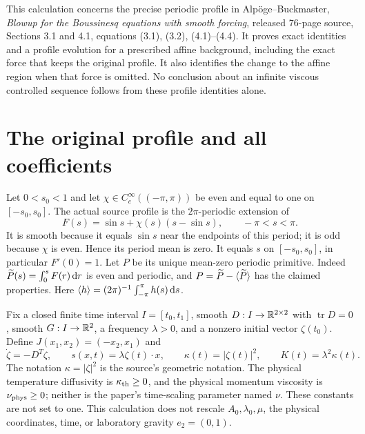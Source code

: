 This calculation concerns the precise periodic profile in Alp\"oge--Buckmaster,
\emph{Blowup for the Boussinesq equations with smooth forcing}, released
76-page source, Sections 3.1 and 4.1, equations (3.1), (3.2), (4.1)--(4.4).
It proves exact identities and a profile evolution for a prescribed affine
background, including the exact force that keeps the original profile.
It also identifies the change to the affine region when that force is
omitted. No conclusion about an infinite viscous controlled sequence follows
from these profile identities alone.

\section{The original profile and all coefficients}

Let $0<s_0<1$ and let $\chi\in C_c^\infty((-\pi,\pi))$ be even and equal to
one on $[-s_0,s_0]$. The actual source profile is the $2\pi$-periodic extension
of
\begin{equation}\label{pd:eq:F}
 F(s)=\sin s+\chi(s)(s-\sin s),\qquad -\pi<s<\pi.
\end{equation}
It is smooth because it equals $\sin s$ near the endpoints of this period;
it is odd because $\chi$ is even. Hence its period mean is zero. It equals
$s$ on $[-s_0,s_0]$, in particular $F'(0)=1$. Let $P$ be its unique
mean-zero periodic primitive. Indeed
$\widetilde P(s)=\int_0^s F(r)\,\mathrm d r$ is even and periodic, and
$P=\widetilde P-\langle \widetilde P\rangle$ has the claimed properties. Here
$\langle h\rangle=(2\pi)^{-1}\int_{-\pi}^{\pi}h(s)\,\mathrm d s$.

Fix a closed finite time interval $I=[t_0,t_1]$, smooth
$D:I\to\mathbb R^{2\times2}$ with $\operatorname{tr}D=0$, smooth
$G:I\to\mathbb R^2$, a frequency $\lambda>0$, and a nonzero initial vector
$\zeta(t_0)$. Define $J(x_1,x_2)=(-x_2,x_1)$ and
\begin{equation}\label{pd:eq:phase}
 \dot\zeta=-D^T\zeta,\qquad s(x,t)=\lambda\zeta(t)\cdot x,
 \qquad \kappa(t)=|\zeta(t)|^2,\qquad K(t)=\lambda^2\kappa(t).
\end{equation}
The notation $\kappa=|\zeta|^2$ is the source's geometric notation.
The physical temperature diffusivity is $\kappa_{\rm th}\geq0$, and the physical
momentum viscosity is $\nu_{\rm phys}\geq0$; neither is the paper's time-scaling
parameter named $\nu$. These constants are not set to one. This calculation
does not rescale $A_0,\lambda_0,\mu$, the physical coordinates, time, or
laboratory gravity $e_2=(0,1)$.

